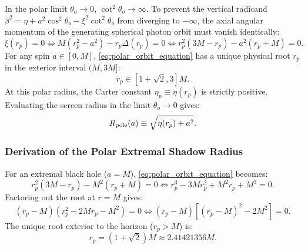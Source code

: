 In the polar limit $\theta_o \to 0$, $\cot^2\theta_o \to \infty$. To prevent the vertical radicand $\beta^2 = \eta + a^2\cos^2\theta_o - \xi^2\cot^2\theta_o$ from diverging to $-\infty$, the axial angular momentum of the generating spherical photon orbit must vanish identically:
\begin{equation}
    \xi(r_p) = 0 \iff M(r_p^2 - a^2) - r_p\Delta(r_p) = 0 \iff r_p^2(3M - r_p) - a^2(r_p + M) = 0.
    \label{eq:polar_orbit_equation}
\end{equation}
For any spin $a \in [0, M]$, \eqref{eq:polar_orbit_equation} has a unique physical root $r_p$ in the exterior interval $(M, 3M]$:
\begin{equation}
    r_p \in [1 + \sqrt{2}, 3]M.
    \label{eq:rp_range}
\end{equation}
At this polar radius, the Carter constant $\eta_p \equiv \eta(r_p)$ is strictly positive. Evaluating the screen radius in the limit $\theta_o \to 0$ gives:
\begin{equation}
    R_{\rm pole}(a) \equiv \sqrt{\eta(r_p) + a^2}.
    \label{eq:polar_circle_radius}
\end{equation}

\subsubsection{Derivation of the Polar Extremal Shadow Radius}
For an extremal black hole ($a = M$), \eqref{eq:polar_orbit_equation} becomes:
\begin{equation}
    r_p^2(3M - r_p) - M^2(r_p + M) = 0 \iff r_p^3 - 3M r_p^2 + M^2 r_p + M^3 = 0.
    \label{eq:extremal_polar_poly}
\end{equation}
Factoring out the root at $r = M$ gives:
\begin{equation}
    (r_p - M)\left( r_p^2 - 2M r_p - M^2 \right) = 0 \iff (r_p - M)\left[ (r_p - M)^2 - 2M^2 \right] = 0.
\end{equation}
The unique root exterior to the horizon ($r_p > M$) is:
\begin{equation}
    r_p = (1 + \sqrt{2})M \approx 2.41421356M.
    \label{eq:rp_extremal_val}
\end{equation}

